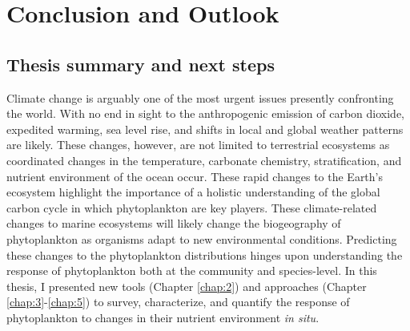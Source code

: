 \chapter{Conclusion and Outlook}
\label{chap:6}
\clearpage
\raggedbottom

\section{Thesis summary and next steps}
  
Climate change is arguably one of the most urgent issues presently confronting the world. With no end in sight to the anthropogenic emission of carbon dioxide, expedited warming, sea level rise, and shifts in local and global weather patterns are likely. These changes, however, are not limited to terrestrial ecosystems as coordinated changes in the temperature, carbonate chemistry, stratification, and nutrient environment of the ocean occur. These rapid changes to the Earth's ecosystem highlight the importance of a holistic understanding of the global carbon cycle in which phytoplankton are key players. These climate-related changes to marine ecosystems will likely change the biogeography of phytoplankton as organisms adapt to new environmental conditions. Predicting these changes to the phytoplankton distributions hinges upon understanding the response of phytoplankton both at the community and species-level. In this thesis, I presented new tools (Chapter \ref{chap:2}) and approaches (Chapter \ref{chap:3}-\ref{chap:5}) to survey, characterize, and quantify the response of phytoplankton to changes in their nutrient environment \textit{in situ}. 


